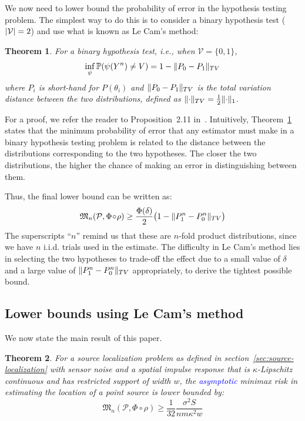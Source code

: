 \documentclass[conference]{IEEEtran}
\DeclarePairedDelimiter\abs{\lvert}{\rvert}
\DeclarePairedDelimiter\norm{\lVert}{\rVert}
\newcommand{\Phiorho}{\Phi\!\circ\!\rho}
\newtheorem{theorem}{Theorem}
\begin{document}
We now need to lower bound the probability of error in the hypothesis testing
problem. The simplest way to do this is to consider a binary hypothesis test
($\abs{\mathcal{V}} = 2$) and use what is known as Le Cam's method:
\begin{theorem} \label{thm:le-cam}
	For a binary hypothesis test, i.e., when $\mathcal{V} = \{0, 1\}$,
	\begin{equation}
		\inf_\psi \mathbb P(\psi(Y^n) \neq V) = 1 - \norm{P_0 - P_1}_{TV}
	\end{equation}
	where $P_i$ is short-hand for $P(\theta_i)$ and $\norm{P_0 - P_1}_{TV}$ is
	the total variation distance between the two distributions, defined as
	$\norm{\cdot}_{TV} = \frac{1}{2} \norm{\cdot}_1$.
\end{theorem}
For a proof, we refer the reader to Proposition~2.11
in~\cite{Duchi2015Information}.  Intuitively, Theorem~\ref{thm:le-cam} states
that the minimum probability of error that any estimator must make in a binary
hypothesis testing problem is related to the distance between the distributions
corresponding to the two hypotheses. The closer the two distributions, the
higher the chance of making an error in distinguishing between them.

Thus, the final lower bound can be written as:
\begin{equation} \label{eq:le-cam-bound}
	\mathfrak{M}_n(\mathcal P, \Phiorho) \geq \frac{\Phi(\delta)}{2} \big(1 - \norm{P_1^n - P_0^n}_{TV}\big)
\end{equation}
The superscripts ``$n$'' remind us that these are $n$-fold product
distributions, since we have $n$ i.i.d. trials used in the estimate.  The
difficulty in Le Cam's method lies in selecting the two hypotheses to trade-off
the effect due to a small value of $\delta$ and a large value of $\norm{P_1^n -
P_0^n}_{TV}$ appropriately, to derive the tightest possible bound.

\subsection{Lower bounds using Le Cam's method}
\label{sec:lecam-lb}

We now state the main result of this paper.
\begin{theorem} \label{thm:main-lb}
	For a source localization problem as defined in
	section~\ref{sec:source-localization} with sensor noise and a spatial
	impulse response that is $\kappa$-Lipschitz continuous and has restricted
	support of width $w$, the \textcolor{blue}{asymptotic} minimax risk in estimating the
	location of a point source is lower bounded by:
	\begin{equation} \label{eq:main-lower-bound}
		\mathfrak{M}_n(\mathcal{P}, \Phiorho) \geq \frac{1}{32} \frac{\sigma^2 S}{nm\kappa^2w}
	\end{equation}
\end{theorem}
\end{document}
